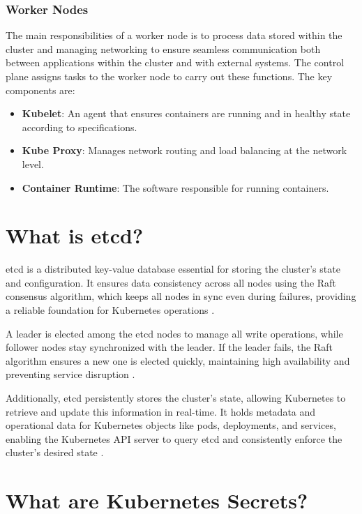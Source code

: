 \documentclass[a4paper,11pt,openright,BCOR=15mm]{scrbook}
\begin{document}
\subsubsection{Worker Nodes}

The main responsibilities of a worker node is to process data stored within the cluster and managing networking to ensure seamless communication both between applications within the cluster and with external systems. The control plane assigns tasks to the worker node to carry out these functions. The key components are:

\begin{itemize}
	\item \textbf{Kubelet}: An agent that ensures containers are running and in healthy state according to specifications.
	\item \textbf{Kube Proxy}: Manages network routing and load balancing at the network level.
	\item \textbf{Container Runtime}: The software responsible for running containers.
\end{itemize}

\section{What is etcd?}

etcd is a distributed key-value database essential for storing the cluster’s state and configuration. It ensures data consistency across all nodes using the Raft consensus algorithm, which keeps all nodes in sync even during failures, providing a reliable foundation for Kubernetes operations \cite{etcd_faq_2024}.

A leader is elected among the etcd nodes to manage all write operations, while follower nodes stay synchronized with the leader. If the leader fails, the Raft algorithm ensures a new one is elected quickly, maintaining high availability and preventing service disruption \cite{etcd_faq_2024}.

Additionally, etcd persistently stores the cluster's state, allowing Kubernetes to retrieve and update this information in real-time. It holds metadata and operational data for Kubernetes objects like pods, deployments, and services, enabling the Kubernetes API server to query etcd and consistently enforce the cluster’s desired state \cite{etcd_faq_2024}.

\section{What are Kubernetes Secrets?}
\end{document}
